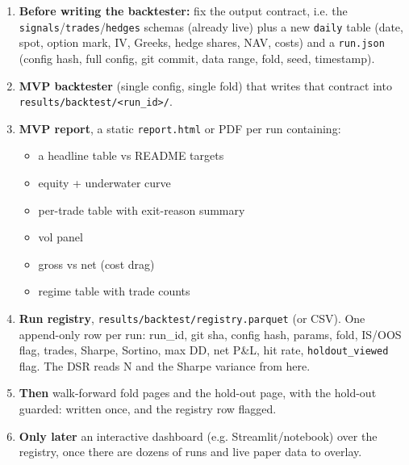 \documentclass{article}
\begin{document}
\begin{enumerate}

\item \textbf{Before writing the backtester:} fix the output contract, i.e. the \texttt{signals}/\allowbreak{}\texttt{trades}/\allowbreak{}\texttt{hedges} schemas (already live) plus a new \texttt{daily} table (date, spot, option mark, IV, Greeks, hedge shares, NAV, costs) and a \texttt{run.\allowbreak{}json} (config hash, full config, git commit, data range, fold, seed, timestamp).

\item \textbf{MVP backtester} (single config, single fold) that writes that contract into \texttt{results/\allowbreak{}backtest/\allowbreak{}<run\_\allowbreak{}id>/\allowbreak{}}.

\item \textbf{MVP report}, a static \texttt{report.\allowbreak{}html} or PDF per run containing:

\begin{itemize}

\item a headline table vs README targets

\item equity + underwater curve

\item per-trade table with exit-reason summary

\item vol panel

\item gross vs net (cost drag)

\item regime table with trade counts

\end{itemize}

\item \textbf{Run registry}, \texttt{results/\allowbreak{}backtest/\allowbreak{}registry.\allowbreak{}parquet} (or CSV). One append-only row per run: run\_id, git sha, config hash, params, fold, IS/\allowbreak{}OOS flag, trades, Sharpe, Sortino, max DD, net P\&L, hit rate, \texttt{holdout\_\allowbreak{}viewed} flag. The DSR reads N and the Sharpe variance from here.

\item \textbf{Then} walk-forward fold pages and the hold-out page, with the hold-out guarded: written once, and the registry row flagged.

\item \textbf{Only later} an interactive dashboard (e.g. Streamlit/\allowbreak{}notebook) over the registry, once there are dozens of runs and live paper data to overlay.

\end{enumerate}
\end{document}
